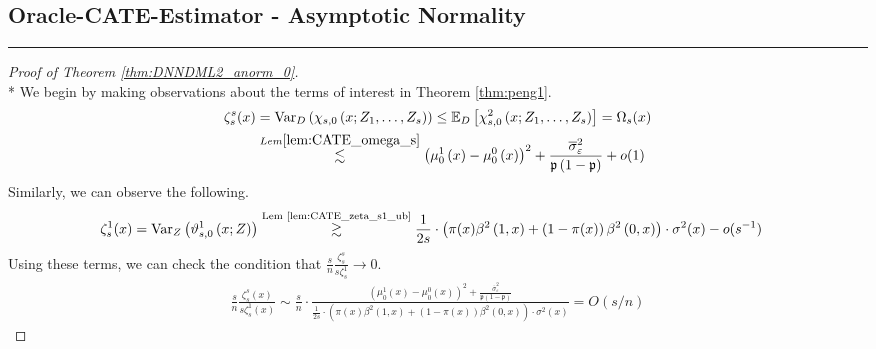 \subsection{Oracle-CATE-Estimator - Asymptotic Normality}
\hrule

\begin{proof}[Proof of Theorem \ref{thm:DNNDML2_anorm_0}]\mbox{}\\*
    We begin by making observations about the terms of interest in Theorem \ref{thm:peng1}.
    \begin{equation}
        \begin{aligned}
            \zeta_{s}^{s}(x)
            & = \text{Var}_{D}\left(\chi_{s,0}\left(x; Z_{1}, \dotsc, Z_{s}\right)\right)
            \leq \mathbb{E}_{D}\left[\chi_{s,0}^{2}\left(x; Z_{1}, \dotsc, Z_{s}\right)\right]
            = \Omega_{s}(x)\\
            & \overset{Lem \ref{lem:CATE_omega_s}}{\lesssim} \left(\mu_{0}^{1}\left(x\right) - \mu_{0}^{0}\left(x\right)\right)^2 + \frac{\overline{\sigma}^2_{\varepsilon}}{\mathfrak{p}\left(1 - \mathfrak{p}\right)} + o(1)
        \end{aligned}
    \end{equation}
    Similarly, we can observe the following.
    \begin{equation}
        \begin{aligned}
            \zeta_{s}^{1}(x)
            & = \text{Var}_{Z}\left(\vartheta_{s,0}^{1}\left(x; Z\right)\right)
            \overset{\text{Lem \ref{lem:CATE_zeta_s1_ub}}}{\gtrsim} 
            \frac{1}{2s} \cdot \left(\pi(x) \beta^{2}\left(1 , x\right) + \left(1-\pi(x)\right) \beta^{2}\left(0 , x\right) \right)\cdot \sigma^{2}(x) - o(s^{-1})
        \end{aligned}
    \end{equation}
    Using these terms, we can check the condition that $\frac{s}{n} \frac{\zeta_{s}^{s}}{s \zeta_{s}^{1}} \rightarrow 0$.
    \begin{equation}
        \begin{aligned}
            \frac{s}{n} \frac{\zeta_{s}^{s}(x)}{s \zeta_{s}^{1}(x)}
            \sim \frac{s}{n} \cdot \frac{\left(\mu_{0}^{1}\left(x\right) - \mu_{0}^{0}\left(x\right)\right)^2 + \frac{\overline{\sigma}^2_{\varepsilon}}{\mathfrak{p}\left(1 - \mathfrak{p}\right)}}{\frac{1}{2s} \cdot \left(\pi(x) \beta^{2}\left(1 , x\right) + \left(1-\pi(x)\right) \beta^{2}\left(0 , x\right) \right)\cdot \sigma^{2}(x)}
            = O(s/n)
        \end{aligned}

\end{equation}
\end{proof}
